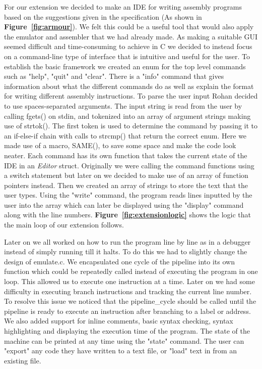 \documentclass[11pt]{article}
\begin{document}
For our extension we decided to make an IDE for writing assembly programs based on the suggestions given in the specification (As shown in \textbf{Figure~\ref{fig:armour}}). We felt this could be a useful tool that would also apply the emulator and assembler that we had already made. As making a suitable GUI seemed difficult and time-consuming to achieve in C we decided to instead focus on a command-line type of interface that is intuitive and useful for the user. To establish the basic framework we created an enum for the top level commands such as "help", "quit" and "clear". There is a "info" command that gives information about what the different commands do as well as explain the format for writing different assembly instructions.  To parse the user input Rohan decided to use spaces-separated arguments. The input string is read from the user by calling fgets() on stdin, and tokenized into an array of argument strings making use of strtok(). The first token is used to determine the command by passing it to an if-else-if chain with calls to strcmp() that return the correct enum. Here we made use of a macro, SAME(), to save some space and make the code look neater. Each command has its own function that takes the current state of the IDE in an \textit{Editor} struct. Originally we were calling the command functions using a switch statement but later on we decided to make use of an array of function pointers instead. Then we created an array of strings to store the text that the user types. Using the "write" command, the program reads lines inputted by the user into the array which can later be displayed using the "display" command along with the line numbers. \textbf{Figure~\ref{fig:extensionlogic}} shows the logic that the main loop of our extension follows.

Later on we all worked on how to run the program line by line as in a debugger instead of simply running till it halts. To do this we had to slightly change the design of emulate.c. We encapsulated one cycle of the pipeline into its own function which could be repeatedly called instead of executing the program in one loop. This allowed us to execute one instruction at a time. Later on we had some difficulty in executing branch instructions and tracking the current line number. To resolve this issue we noticed that the pipeline\_cycle should be called until the pipeline is ready to execute an instruction after branching to a label or address. We also added support for inline comments, basic syntax checking, syntax highlighting and displaying the execution time of the program. The state of the machine can be printed at any time using the "state" command. The user can "export" any code they have written to a text file, or "load" text in from an existing file. 
\end{document}
